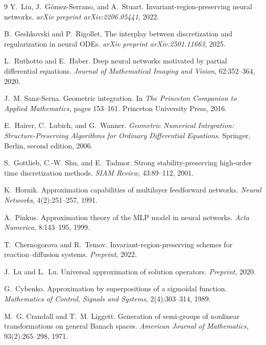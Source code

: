 \documentclass[11pt]{article}
\begin{document}
\begin{thebibliography}{9}
Y.~Liu, J.~G{\'o}mez-Serrano, and A.~Stuart.
Invariant-region-preserving neural networks.
\emph{arXiv preprint arXiv:2206.05441}, 2022.

B.~Geshkovski and P.~Rigollet.
The interplay between discretization and regularization in neural ODEs.
\emph{arXiv preprint arXiv:2501.11663}, 2025.

L.~Ruthotto and E.~Haber.
Deep neural networks motivated by partial differential equations.
\emph{Journal of Mathematical Imaging and Vision}, 62:352--364, 2020.

J.~M. Sanz-Serna.
Geometric integration.
In \emph{The Princeton Companion to Applied Mathematics}, pages 153--161. Princeton University Press, 2016.

E.~Hairer, C.~Lubich, and G.~Wanner.
\emph{Geometric Numerical Integration: Structure-Preserving Algorithms for Ordinary Differential Equations}.
Springer, Berlin, second edition, 2006.

S.~Gottlieb, C.-W. Shu, and E.~Tadmor.
Strong stability-preserving high-order time discretization methods.
\emph{SIAM Review}, 43:89--112, 2001.

K.~Hornik.
Approximation capabilities of multilayer feedforward networks.
\emph{Neural Networks}, 4(2):251--257, 1991.

A.~Pinkus.
Approximation theory of the MLP model in neural networks.
\emph{Acta Numerica}, 8:143--195, 1999.

T.~Chernogorova and R.~Temov.
Invariant-region-preserving schemes for reaction--diffusion systems.
\emph{Preprint}, 2022.

J.~Lu and L.~Lu.
Universal approximation of solution operators.
\emph{Preprint}, 2020.

G.~Cybenko.
Approximation by superpositions of a sigmoidal function.
\emph{Mathematics of Control, Signals and Systems}, 2(4):303--314, 1989.

M.~G. Crandall and T.~M. Liggett.
Generation of semi-groups of nonlinear transformations on general Banach spaces.
\emph{American Journal of Mathematics}, 93(2):265--298, 1971.


\end{thebibliography}
\end{document}
